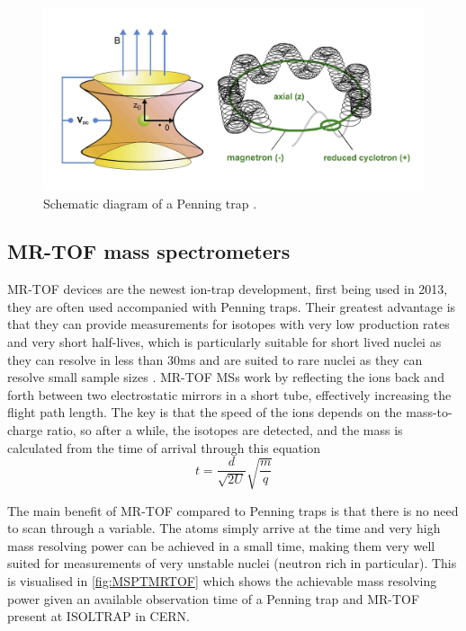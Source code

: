 
\begin{figure}[H]
    \centering
    \includegraphics[width=.5\textwidth]{images/MS_penningtrap.png}
    \caption{Schematic diagram of a Penning trap \cite{famiano_nuclear_2019}.}\label{fig:MS_PT}
\end{figure}

\subsection{MR-TOF mass spectrometers}
MR-TOF devices are the newest ion-trap development, first being used in 2013, they are often used accompanied with Penning traps.
Their greatest advantage is that they can provide measurements for isotopes with very low production rates and very short half-lives, which is particularly suitable for short lived nuclei as they can resolve in less than 30ms and are suited to rare nuclei as they can resolve small sample sizes \cite{wolf_isoltraps_2013}.
MR-TOF MSs work by reflecting the ions back and forth between two electrostatic mirrors in a short tube, effectively increasing the flight path length.
The key is that the speed of the ions depends on the mass-to-charge ratio, so after a while, the isotopes are detected, and the mass is calculated from the time of arrival through this equation
\begin{equation}
    t = \frac{d}{\sqrt{2U}}\sqrt{\frac{m}{q}}
\end{equation}

The main benefit of MR-TOF compared to Penning traps is that there is no need to scan through a variable.
The atoms simply arrive at the time and very high mass resolving power can be achieved in a small time, making them very well suited for measurements of very unstable nuclei (neutron rich in particular).
This is visualised in \cref{fig:MSPTMRTOF} which shows the achievable mass resolving power given an available observation time of a Penning trap and MR-TOF present at ISOLTRAP in CERN.

